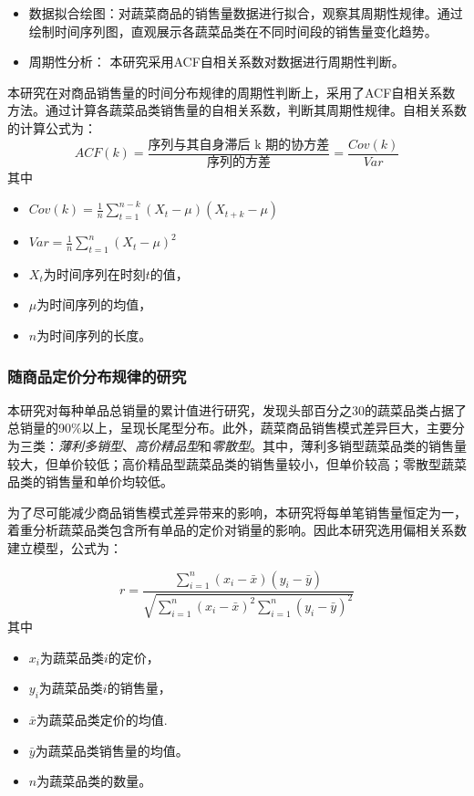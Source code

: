 \documentclass{article}
\begin{document}
\begin{itemize}
    \item 数据拟合绘图：对蔬菜商品的销售量数据进行拟合，观察其周期性规律。通过绘制时间序列图，直观展示各蔬菜品类在不同时间段的销售量变化趋势。
    \item 周期性分析： 本研究采用ACF自相关系数对数据进行周期性判断。
\end{itemize}

本研究在对商品销售量的时间分布规律的周期性判断上，采用了ACF自相关系数方法。通过计算各蔬菜品类销售量的自相关系数，判断其周期性规律。自相关系数的计算公式为：
\[ACF(k) = \frac{\text{序列与其自身滞后 k 期的协方差}}{\text{序列的方差}} = \frac{Cov(k)}{Var}\]
其中\begin{itemize}
    \item $Cov(k) = \frac{1}{n} \sum_{t=1}^{n-k} (X_t - \mu)(X_{t+k} - \mu)$
    \item $Var = \frac{1}{n} \sum_{t=1}^{n} (X_t - \mu)^2$
    \item $X_t$为时间序列在时刻$t$的值，
    \item $\mu$为时间序列的均值，
    \item $n$为时间序列的长度。
\end{itemize}

\subsubsection{随商品定价分布规律的研究}
本研究对每种单品总销量的累计值进行研究，发现头部百分之30的蔬菜品类占据了总销量的90\%以上，呈现长尾型分布。此外，蔬菜商品销售模式差异巨大，主要分为三类：\textit{薄利多销型}、\textit{高价精品型}和\textit{零散型}。其中，薄利多销型蔬菜品类的销售量较大，但单价较低；高价精品型蔬菜品类的销售量较小，但单价较高；零散型蔬菜品类的销售量和单价均较低。

为了尽可能减少商品销售模式差异带来的影响，本研究将每单笔销售量恒定为一，着重分析蔬菜品类包含所有单品的定价对销量的影响。因此本研究选用偏相关系数建立模型，公式为：

\[
r = \frac{
    \sum_{i=1}^{n} (x_i - \bar{x})(y_i - \bar{y})
}{
    \sqrt{
        \sum_{i=1}^{n} (x_i - \bar{x})^2
        \sum_{i=1}^{n} (y_i - \bar{y})^2
    }
}
\]
其中
\begin{itemize}
    \item $x_i$为蔬菜品类$i$的定价，
    \item $y_i$为蔬菜品类$i$的销售量，
    \item $\bar{x}$为蔬菜品类定价的均值.
    \item $\bar{y}$为蔬菜品类销售量的均值。
    \item $n$为蔬菜品类的数量。
\end{itemize}
\end{document}
